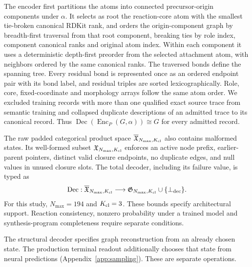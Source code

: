 \documentclass{article}
\theoremstyle{definition}
\begin{document}
The encoder first partitions the atoms into connected precursor-origin components under $\alpha$.
It selects as root the reaction-core atom with the smallest tie-broken canonical RDKit rank, and
orders the origin-component graph by breadth-first traversal from that root component, breaking
ties by role index, component canonical ranks and original atom index. Within each component it uses
a deterministic depth-first preorder from the selected attachment atom, with neighbors ordered by
the same canonical ranks. The traversed bonds define the spanning tree. Every residual bond is
represented once as an ordered endpoint pair with its bond label, and residual triples are sorted
lexicographically. Role, core, fixed-coordinate and morphology arrays follow the
same atom order. We excluded training records with more than one qualified exact source trace
from semantic training and collapsed duplicate descriptions of an admitted trace to its canonical
record. Thus
$\operatorname{Dec}(\operatorname{Enc}_P(G,\alpha))\cong G$ for every admitted record.

The raw padded categorical product space $\overline{\mathfrak X}_{N_{\max},K_{\rm cl}}$ also
contains malformed states. Its well-formed subset $\mathfrak X_{N_{\max},K_{\rm cl}}$ enforces an
active node prefix, earlier-parent pointers, distinct valid closure endpoints, no duplicate edges,
and null values in unused closure slots. The total decoder, including its failure value, is typed as
\begin{equation}
    \operatorname{Dec}:\overline{\mathfrak X}_{N_{\max},K_{\rm cl}}
    \longrightarrow
    \mathfrak G_{N_{\max},K_{\rm cl}}\cup\{\bot_{\rm dec}\}.
\end{equation}
For this study, $N_{\max}=194$ and $K_{\rm cl}=3$.
These bounds specify architectural support. Reaction consistency, nonzero probability under a
trained model and synthesis-program completeness require separate conditions.

The structural decoder specifies graph reconstruction from an already chosen state.
The production terminal readout additionally chooses that state from neural predictions
(Appendix~\ref{app:sampling}). These are separate operations.
\end{document}
